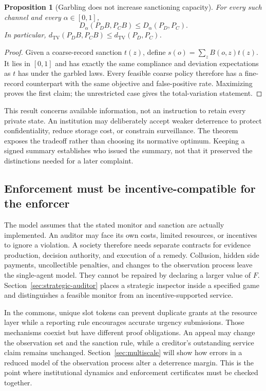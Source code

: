 \documentclass[11pt,letterpaper]{article}
\theoremstyle{plain}
\newtheorem{proposition}{Proposition}[section]
\theoremstyle{definition}
\theoremstyle{remark}
\newcommand{\TV}{d_{\mathrm{TV}}}
\begin{document}
\begin{proposition}[Garbling does not increase sanctioning capacity]\label{prop:enforcement-garbling}
For every such channel and every $\alpha\in[0,1]$,
\[
D_\alpha(P_D B,P_C B)\leq D_\alpha(P_D,P_C).
\]
In particular, $\TV(P_D B,P_C B)\leq\TV(P_D,P_C)$.
\end{proposition}
\begin{proof}
Given a coarse-record sanction $t(z)$, define $s(o)=\sum_z B(o,z)t(z)$. It lies in $[0,1]$ and has exactly the same compliance and deviation expectations as $t$ has under the garbled laws. Every feasible coarse policy therefore has a fine-record counterpart with the same objective and false-positive rate. Maximizing proves the first claim; the unrestricted case gives the total-variation statement.
\end{proof}

This result concerns available information, not an instruction to retain every private state. An institution may deliberately accept weaker deterrence to protect confidentiality, reduce storage cost, or constrain surveillance. The theorem exposes the tradeoff rather than choosing its normative optimum. Keeping a signed summary establishes who issued the summary, not that it preserved the distinctions needed for a later complaint.

\subsection{Enforcement must be incentive-compatible for the enforcer}
The model assumes that the stated monitor and sanction are actually implemented. An auditor may face its own costs, limited resources, or incentives to ignore a violation. A society therefore needs separate contracts for evidence production, decision authority, and execution of a remedy. Collusion, hidden side payments, uncollectible penalties, and changes to the observation process leave the single-agent model. They cannot be repaired by declaring a larger value of $F$. Section~\ref{sec:strategic-auditor} places a strategic inspector inside a specified game and distinguishes a feasible monitor from an incentive-supported service.

In the commons, unique slot tokens can prevent duplicate grants at the resource layer while a reporting rule encourages accurate urgency submissions. Those mechanisms coexist but have different proof obligations. An appeal may change the observation set and the sanction rule, while a creditor's outstanding service claim remains unchanged. Section~\ref{sec:multiscale} will show how errors in a reduced model of the observation process alter a deterrence margin. This is the point where institutional dynamics and enforcement certificates must be checked together.
\end{document}
